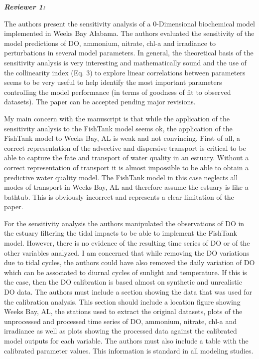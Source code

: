 \documentclass[letterpaper,12pt]{article}\usepackage[]{graphicx}\usepackage[]{color}
\newcommand{\Bigtxt}[1]{\textbf{\textit{#1}}}
\begin{document}
\Bigtxt{Reviewer 1:}

The authors present the sensitivity analysis of a 0-Dimensional biochemical model implemented in Weeks Bay Alabama. The authors evaluated the sensitivity of the model predictions of DO, ammonium, nitrate, chl-a and irradiance to perturbations in several model parameters. In general, the theoretical basis of the sensitivity analysis is very interesting and mathematically sound and the use of the collinearity index (Eq. 3) to explore linear correlations between parameters seems to be very useful to help identify the most important parameters controlling the model performance (in terms of goodness of fit to observed datasets). The paper can be accepted pending major revisions. 

My main concern with the manuscript is that while the application of the sensitivity analysis to the FishTank model seems ok, the application of the FishTank model to Weeks Bay, AL is weak and not convincing. First of all, a correct representation of the advective and dispersive transport is critical to be able to capture the fate and transport of water quality in an estuary. Without a correct representation of transport it is almost impossible to be able to obtain a predictive water quality model. The FishTank model in this case neglects all modes of transport in Weeks Bay, AL and therefore assume the estuary is like a bathtub. This is obviously incorrect and represents a clear limitation of the paper.

For the sensitivity analysis the authors manipulated the observations of DO in the estuary filtering the tidal impacts to be able to implement the FishTank model. However, there is no evidence of the resulting time series of DO or of the other variables analyzed. I am concerned that while removing the DO variations due to tidal cycles, the authors could have also removed the daily variation of DO which can be associated to diurnal cycles of sunlight and temperature. If this is the case, then the DO calibration is based almost on synthetic and unrealistic DO data. The authors must include a section showing the data that was used for the calibration analysis. This section should include a location figure showing Weeks Bay, AL, the stations used to extract the original datasets, plots of the unprocessed and processed time series of DO, ammonium, nitrate, chl-a and irradiance as well as plots showing the processed data against the calibrated model outputs for each variable. The authors must also include a table with the calibrated parameter values. This information is standard in all modeling studies.
\end{document}
